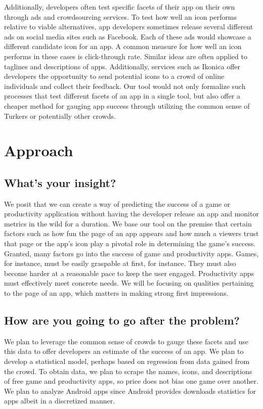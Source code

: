 \documentclass{article}
\begin{document}
Additionally, developers often test specific facets of their app on their own through ads and crowdsourcing services. To test how well an icon performs relative to viable alternatives, app developers sometimes release several different ads on social media sites such as Facebook. Each of these ads would showcase a different candidate icon for an app. A common measure for how well an icon performs in these cases is click-through rate. Similar ideas are often applied to taglines and descriptions of apps. Additionally, services such as Ikonica offer developers the opportunity to send potential icons to a crowd of online individuals and collect their feedback. Our tool would not only formalize such processes that test different facets of an app in a single tool, but also offer a cheaper method for gauging app success through utilizing the common sense of Turkers or potentially other crowds.

\section{Approach}

\subsection{What’s your insight?}

We posit that we can create a way of predicting the success of a game or productivity application without having the developer release an app and monitor metrics in the wild for a duration. We base our tool on the premise that certain factors such as how fun the page of an app appears and how much a viewers trust that page or the app’s icon play a pivotal role in determining the game’s success. \\

Granted, many factors go into the success of game and productivity apps. Games, for instance, must be easily graspable at first, for instance. They must also become harder at a reasonable pace to keep the user engaged. Productivity apps must effectively meet concrete needs. We will be focusing on qualities pertaining to the page of an app, which matters in making strong first impressions.

\subsection{How are you going to go after the problem?}

We plan to leverage the common sense of crowds to gauge these facets and use this data to offer developers an estimate of the success of an app. We plan to develop a statistical model, perhaps based on regression from data gained from the crowd. To obtain data, we plan to scrape the names, icons, and descriptions of free game and productivity apps, so price does not bias one game over another. We plan to analyze Android apps since Android provides downloads statistics for apps albeit in a discretized manner. \\
\end{document}
